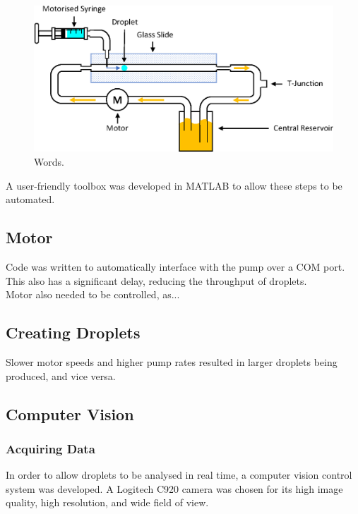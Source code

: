 \documentclass{physics_article_B}
\begin{document}
\begin{figure}[H]
\centering
\hspace*{-0.9cm}\includegraphics[scale=0.8]{Figures/Fluid.eps}
\captionsetup{justification=centering}
\caption{Words.} 	
\label{fig:basic}
\end{figure} 

A user-friendly toolbox was developed in MATLAB to allow these steps to be automated.
    
    \subsection{Motor}
    Code was written to automatically interface with the pump over a COM port. This also has a significant delay, reducing the throughput of droplets.\\
    
    Motor also needed to be controlled, as...
    
    \subsection{Creating Droplets}
    Slower motor speeds and higher pump rates resulted in larger droplets being produced, and vice versa.
    \subsection{Computer Vision\label{sect_vision}}
        
        \subsubsection{Acquiring Data}
        In order to allow droplets to be analysed in real time, a computer vision control system was developed. A Logitech C920 camera was chosen for its high image quality, high resolution, and wide field of view. \\
        
\end{document}
